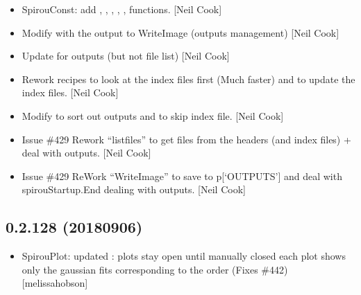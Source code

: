 \documentclass[a4paper,10pt,english]{report}
\begin{document}
\begin{itemize}
\item {} 
SpirouConst: add , ,
, , ,
 functions. {[}Neil Cook{]}

\item {} 
Modify  with the output to WriteImage (outputs management)
{[}Neil Cook{]}

\item {} 
Update  for outputs (but not file list) {[}Neil Cook{]}

\item {} 
Re\sphinxhyphen{}work  recipes to look at the index files first (Much
faster) \sphinxhyphen{} and to update the index files. {[}Neil Cook{]}

\item {} 
Modify  to sort out outputs and to skip index
file. {[}Neil Cook{]}

\item {} 
Issue \#429 \sphinxhyphen{} Re\sphinxhyphen{}work “listfiles” to get files from the headers (and
index files) + deal with outputs. {[}Neil Cook{]}

\item {} 
Issue \#429 \sphinxhyphen{} ReWork “WriteImage” to save to p{[}‘OUTPUTS’{]} and deal with
spirouStartup.End dealing with outputs. {[}Neil Cook{]}

\end{itemize}


\subsection{0.2.128 (2018\sphinxhyphen{}09\sphinxhyphen{}06)}
\label{\detokenize{misc/changelog:id354}}\begin{itemize}
\item {} 
SpirouPlot: updated : \sphinxhyphen{} plots stay open
until manually closed \sphinxhyphen{} each plot shows only the gaussian fits
corresponding to the order (Fixes \#442) {[}melissa\sphinxhyphen{}hobson{]}

\end{itemize}
\end{document}
